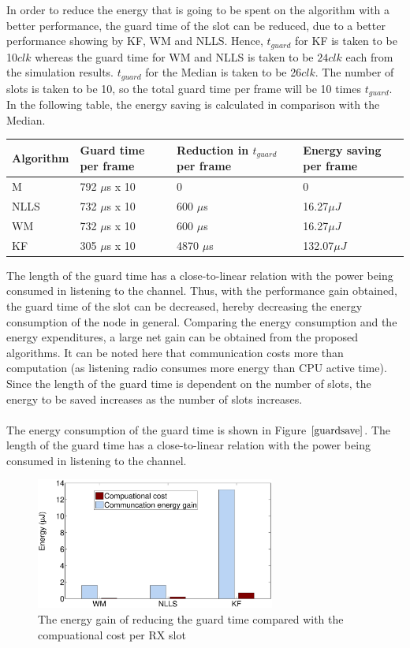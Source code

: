 \documentclass[a4paper,10pt]{report}
\begin{document}
In order to reduce the energy that is going to be spent on the algorithm with a better performance, the guard time of the slot can be reduced, due to a better performance showing by KF, WM and NLLS. 
Hence, $t_{guard}$ for KF is taken to be 10$clk$ whereas the guard time for WM and NLLS is taken to be $24clk$ each from the simulation results. $t_{guard}$ for the Median is taken to be 26$clk$. The number of slots is taken to be 10, so the total guard time per frame will be 10 times $t_{guard}$. In the following table, the energy saving is calculated in comparison with the Median. 
\begin{center}
    \begin{tabular}{ |p{3cm} | p{3cm} |p{3cm} | p{3cm} |  }
    \hline
    Algorithm & Guard time per frame & Reduction in $t_{guard}$ per frame & Energy saving per frame\\ \hline
    M &  792 $\mu$s x 10 & 0 & 0 \\ \hline
    NLLS & 732 $\mu$s x 10 & 600 $\mu$s & 16.27$\mu J$\\ \hline
    WM &   732 $\mu$s x 10 & 600 $\mu$s & 16.27$\mu J$ \\ \hline
    KF &  305 $\mu$s x 10 & 4870 $\mu$s & 132.07$\mu J$\\ \hline
    \end{tabular}
\label{tab}
\end{center}
The length of the guard time has a close-to-linear relation with the power being consumed in listening to the channel. Thus, with the performance gain obtained, the guard time of the slot can be decreased, hereby decreasing the energy consumption of the node in general. Comparing the energy consumption and the energy expenditures, a large net gain can be obtained from the proposed algorithms. It can be noted here that communication costs more than computation (as listening radio consumes more energy than CPU active time). Since the length of the guard time is dependent on the number of slots, the energy to be saved increases as the number of slots increases.\paragraph*{}
The energy consumption of the guard time is shown in Figure $\ref{guardsave}$. The length of the guard time has a close-to-linear relation with the power being consumed in listening to the channel.
\begin{figure}
\centering
\includegraphics[width=0.7\textwidth]{commvscompute}
\caption{The energy gain of reducing the guard time compared with the compuational cost per RX slot}
\label{guardsave}
\end{figure}
\end{document}

